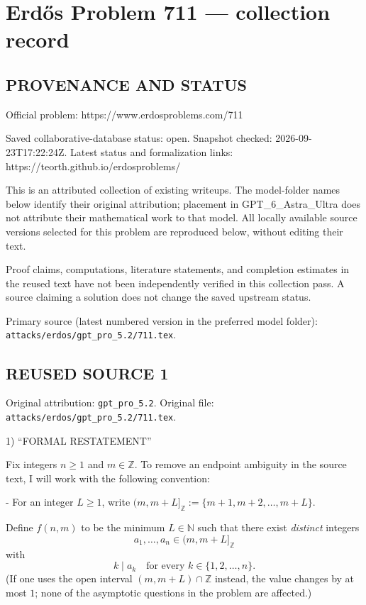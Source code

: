 \section*{Erd\H{o}s Problem 711 --- collection record}

\subsection*{PROVENANCE AND STATUS}
Official problem: https://www.erdosproblems.com/711

Saved collaborative-database status: open.
Snapshot checked: 2026-09-23T17:22:24Z.
Latest status and formalization links: https://teorth.github.io/erdosproblems/

This is an attributed collection of existing writeups. The model-folder names below identify their original attribution; placement in GPT\_6\_Astra\_Ultra does not attribute their mathematical work to that model. All locally available source versions selected for this problem are reproduced below, without editing their text.

Proof claims, computations, literature statements, and completion estimates in the reused text have not been independently verified in this collection pass. A source claiming a solution does not change the saved upstream status.

Primary source (latest numbered version in the preferred model folder): \texttt{attacks/erdos/gpt\_pro\_5.2/711.tex}.

\subsection*{REUSED SOURCE 1}
Original attribution: \texttt{gpt\_pro\_5.2}.
Original file: \texttt{attacks/erdos/gpt\_pro\_5.2/711.tex}.


1) “FORMAL RESTATEMENT”

Fix integers $n\ge 1$ and $m\in\mathbb Z$. To remove an endpoint ambiguity in the source text, I will work with the following convention:

- For an integer $L\ge 1$, write $(m,m+L]_{\mathbb Z}:=\{m+1,m+2,\dots,m+L\}$.

Define $f(n,m)$ to be the minimum $L\in\mathbb N$ such that there exist \emph{distinct} integers
\[
 a_1,\dots,a_n\in (m,m+L]_{\mathbb Z}
\]
with
\[
 k\mid a_k\quad\text{for every }k\in\{1,2,\dots,n\}.
\]
(If one uses the open interval $(m,m+L)\cap\mathbb Z$ instead, the value changes by at most $1$; none of the asymptotic questions in the problem are affected.)

